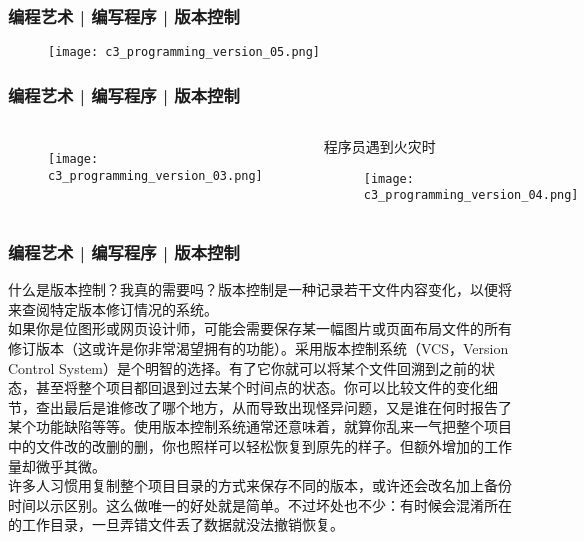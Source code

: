 \begin{frame}
  \frametitle{编程艺术 | 编写程序 | 版本控制}
  \begin{figure}
    \centering
    \texttt{[image: c3\_programming\_version\_05.png]}
  \end{figure}
\end{frame}

\begin{frame}
  \frametitle{编程艺术 | 编写程序 | 版本控制}
  \begin{columns}
  \begin{figure}
    \centering
    \texttt{[image: c3\_programming\_version\_03.png]}
  \end{figure}
  \begin{block}{程序员遇到火灾时}
  \begin{figure}
    \centering
    \texttt{[image: c3\_programming\_version\_04.png]}
  \end{figure}
  \end{block}
\end{columns}
\end{frame}

\begin{frame}
  \frametitle{编程艺术 | 编写程序 | 版本控制}
  什么是版本控制？我真的需要吗？版本控制是一种记录若干文件内容变化，以便将来查阅特定版本修订情况的系统。\\
  \vspace{1em}
  如果你是位图形或网页设计师，可能会需要保存某一幅图片或页面布局文件的所有修订版本（这或许是你非常渴望拥有的功能）。采用版本控制系统（VCS，Version Control System）是个明智的选择。有了它你就可以将某个文件回溯到之前的状态，甚至将整个项目都回退到过去某个时间点的状态。你可以比较文件的变化细节，查出最后是谁修改了哪个地方，从而导致出现怪异问题，又是谁在何时报告了某个功能缺陷等等。使用版本控制系统通常还意味着，就算你乱来一气把整个项目中的文件改的改删的删，你也照样可以轻松恢复到原先的样子。但额外增加的工作量却微乎其微。\\
  \vspace{1em}
  许多人习惯用复制整个项目目录的方式来保存不同的版本，或许还会改名加上备份时间以示区别。这么做唯一的好处就是简单。不过坏处也不少：有时候会混淆所在的工作目录，一旦弄错文件丢了数据就没法撤销恢复。
\end{frame}

